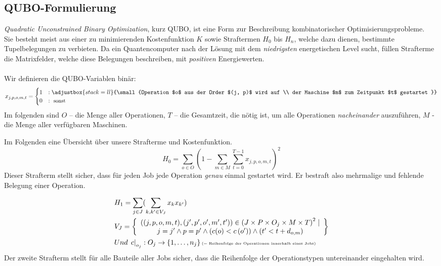 \subsection{QUBO-Formulierung}
\label{subsec:qubo}
\textit{Quadratic Unconstrained Binary Optimization}, kurz QUBO, ist eine Form zur Beschreibung %
kombinatorischer Optimisierungsprobleme.\\
Sie besteht meist aus einer zu minimierenden Kostenfunktion $K$ sowie Straftermen $H_{0}$ bis $H_{n}$, welche dazu dienen, bestimmte Tupelbelegungen zu verbieten. Da ein Quantencomputer nach der Lösung mit dem \textit{niedrigsten} energetischen Level sucht, füllen Strafterme die Matrixfelder, welche diese Belegungen beschreiben, mit \textit{positiven} Energiewerten.\\\\
Wir definieren die QUBO-Variablen  binär:
\begin{equation}
x_{j, p, o, m, t}= \begin{cases}1 & : \adjustbox{stack=ll}{\small{Operation $o$ aus der Order $(j, p)$ wird auf \\ der Maschine $m$ zum Zeitpunkt $t$ gestartet }} \\ 0 & : \text { \small{sonst} }\end{cases}
\end{equation}
Im folgenden sind $O$ – die Menge aller Operationen, $T$ – die Gesamtzeit, die nötig ist, um alle Operationen \textit{nacheinander} auszuführen, $M$ - die Menge aller verfügbaren Maschinen.

Im Folgenden eine Übersicht über unsere Strafterme und Kostenfunktion.
\begin{equation}
H_{0} = \sum_{o\in O} (1 - \sum_{m\in M} \sum_{t=0}^{T-1} x_{j,p,o,m,t})^2
\label{H0}
\end{equation}
Dieser Strafterm stellt sicher, dass für jeden Job jede Operation \textit{genau} einmal gestartet wird. Er bestraft also mehrmalige und fehlende Belegung einer Operation\cite{Denkena2021}.

\begin{align}
&H_{1} = \sum_{j\in J} (\sum_{k, k'\in V_{J}} x_{k}x_{k'})\\
&{V}_{J}= \left\{ \begin{array}{c}
\left((j, p, o, m, t),\left(j^{\prime}, p^{\prime}, o^{\prime}, m^{\prime}, t^{\prime}\right)\right) \in\left(J \times P \times O_{j} \times M \times T\right)^{2} \mid \\
j=j^{\prime} \wedge p=p^{\prime} \wedge\left(c(o)<c\left(o^{\prime}\right)\right) \wedge\left(t^{\prime}<t+d_{o, m}\right)
\end{array} \right\}\\
&Und\, \left.c\right|_{o_{j}}: O_{j} \rightarrow\left\{1, \ldots, n_{j}\right\} \text{\tiny{(=  Reihenfolge der Operationen innerhalb eines Jobs)}}
\label{H1}
\end{align}
Der zweite Strafterm stellt für alle Bauteile aller Jobs sicher, dass die Reihenfolge der Operationstypen untereinander eingehalten wird\cite{Denkena2021}.

